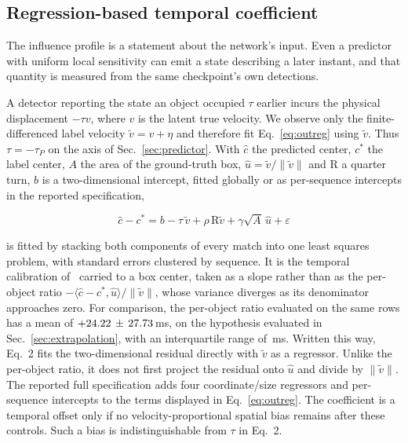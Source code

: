 \documentclass[10pt,twocolumn,letterpaper]{article}
\begin{document}
\subsection{Regression-based temporal coefficient}
\label{sec:outputtime}

The influence profile is a statement about the network's input. Even a predictor
with uniform local sensitivity can emit a state describing a later instant,
and that quantity is measured from the same checkpoint's own detections.

A detector reporting the state an object occupied $\tau$ earlier incurs the
physical displacement $-\tau v$, where $v$ is the latent true velocity. We
observe only the finite-differenced label velocity $\tilde v=v+\eta$ and
therefore fit Eq.~\ref{eq:outreg} using $\tilde v$. Thus
$\tau=-\tau_{P}$ on the axis of Sec.~\ref{sec:predictor}. With $\hat{c}$ the
predicted center, $c^{*}$ the label center, $A$ the area of the ground-truth
box, $\hat{u}=\tilde v/\lVert \tilde v\rVert$ and $\mathrm{R}$ a quarter turn,
$b$ is a two-dimensional intercept, fitted globally or as per-sequence
intercepts in the reported specification,

\begin{equation}
\hat{c}-c^{*}=b-\tau\,\tilde v+\rho\,\mathrm{R}\tilde v+\gamma\sqrt{A}\,\hat{u}+\varepsilon
\label{eq:outreg}
\end{equation}

\noindent is fitted by stacking both components of every match into one least
squares problem, with standard errors clustered by sequence. It is the temporal
calibration of~\cite{qin2018temporal} carried to a box center, taken as a slope
rather than as the per-object ratio $-\langle
\hat{c}-c^{*},\hat{u}\rangle/\lVert \tilde v\rVert$, whose variance diverges as its
denominator approaches zero. For comparison, the per-object ratio evaluated on
the same rows has a mean of
$+24.22\,\pm\,27.73$\,ms, on the hypothesis evaluated in
Sec.~\ref{sec:extrapolation}, with an interquartile range of \ratioIQR\,ms.
Written this way, Eq.~2 fits the two-dimensional residual directly with $\tilde v$ as a
regressor. Unlike the per-object ratio, it does not first project the residual onto $\hat u$
and divide by $\|\tilde v\|$.
The reported full specification adds four coordinate/size regressors and
per-sequence intercepts to the terms displayed in Eq.~\ref{eq:outreg}.
The coefficient is a temporal offset only if no velocity-proportional spatial
bias remains after these controls. Such a bias is indistinguishable from $\tau$ in Eq.~2.
\end{document}
